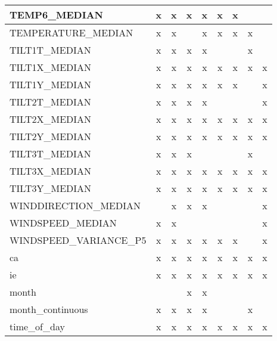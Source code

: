 \begin{longtable}{|lcccccccc|}
    TEMP6\_MEDIAN &      x &      x &      x &      x &      x &      x &        &        \\ \hline
    TEMPERATURE\_MEDIAN &      x &      x &        &      x &      x &      x &      x &        \\ \hline
    TILT1T\_MEDIAN &      x &      x &      x &      x &        &        &      x &        \\ \hline
    TILT1X\_MEDIAN &      x &      x &      x &      x &      x &      x &      x &      x \\ \hline
    TILT1Y\_MEDIAN &      x &      x &      x &      x &      x &      x &        &      x \\ \hline
    TILT2T\_MEDIAN &      x &      x &      x &      x &        &        &        &      x \\ \hline
    TILT2X\_MEDIAN &      x &      x &      x &      x &      x &      x &      x &      x \\ \hline
    TILT2Y\_MEDIAN &      x &      x &      x &      x &      x &      x &      x &      x \\ \hline
    TILT3T\_MEDIAN &      x &      x &      x &        &        &        &      x &        \\ \hline
    TILT3X\_MEDIAN &      x &      x &      x &      x &      x &      x &      x &      x \\ \hline
    TILT3Y\_MEDIAN &      x &      x &      x &      x &      x &      x &      x &      x \\ \hline
    WINDDIRECTION\_MEDIAN &        &      x &      x &      x &        &        &        &      x \\ \hline
    WINDSPEED\_MEDIAN &      x &      x &        &        &        &        &        &      x \\ \hline
    WINDSPEED\_VARIANCE\_P5 &      x &      x &      x &      x &      x &      x &        &      x \\ \hline
    ca &      x &      x &      x &      x &      x &      x &      x &      x \\ \hline
    ie &      x &      x &      x &      x &      x &      x &      x &      x \\ \hline
    month &        &        &      x &      x &        &        &        &        \\ \hline
    month\_continuous &      x &      x &      x &      x &        &        &      x &        \\ \hline
    time\_of\_day &      x &      x &      x &      x &      x &      x &      x &      x \\ \hline
\end{longtable}        





